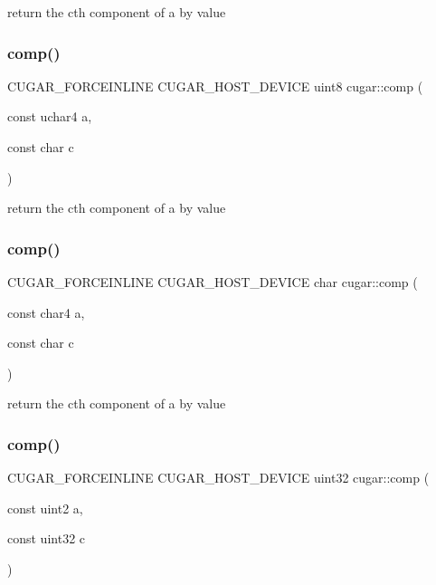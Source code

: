 return the c\textquotesingle{}th component of a by value \mbox{\label{group___basic_gaa695cfa1e048a121c9cbdf1e543d7f1b}} 
\subsubsection{\texorpdfstring{comp()}{comp()}\hspace{0.1cm}{\footnotesize\ttfamily [3/11]}}
{\footnotesize\ttfamily C\+U\+G\+A\+R\+\_\+\+F\+O\+R\+C\+E\+I\+N\+L\+I\+NE C\+U\+G\+A\+R\+\_\+\+H\+O\+S\+T\+\_\+\+D\+E\+V\+I\+CE uint8 cugar\+::comp (\begin{DoxyParamCaption}\item[{const uchar4}]{a,  }\item[{const char}]{c }\end{DoxyParamCaption})}

return the c\textquotesingle{}th component of a by value \mbox{\label{group___basic_gac54a46b198c76c9c29ccfca71fb5a71b}} 
\subsubsection{\texorpdfstring{comp()}{comp()}\hspace{0.1cm}{\footnotesize\ttfamily [4/11]}}
{\footnotesize\ttfamily C\+U\+G\+A\+R\+\_\+\+F\+O\+R\+C\+E\+I\+N\+L\+I\+NE C\+U\+G\+A\+R\+\_\+\+H\+O\+S\+T\+\_\+\+D\+E\+V\+I\+CE char cugar\+::comp (\begin{DoxyParamCaption}\item[{const char4}]{a,  }\item[{const char}]{c }\end{DoxyParamCaption})}

return the c\textquotesingle{}th component of a by value \mbox{\label{group___basic_ga5831bedd2e38ee10534adde39ab79f2c}} 
\subsubsection{\texorpdfstring{comp()}{comp()}\hspace{0.1cm}{\footnotesize\ttfamily [5/11]}}
{\footnotesize\ttfamily C\+U\+G\+A\+R\+\_\+\+F\+O\+R\+C\+E\+I\+N\+L\+I\+NE C\+U\+G\+A\+R\+\_\+\+H\+O\+S\+T\+\_\+\+D\+E\+V\+I\+CE uint32 cugar\+::comp (\begin{DoxyParamCaption}\item[{const uint2}]{a,  }\item[{const uint32}]{c }\end{DoxyParamCaption})}

